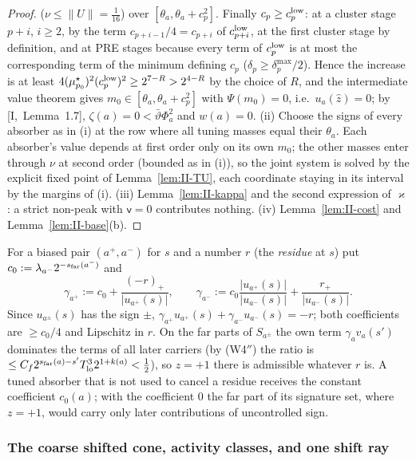 \documentclass[10pt]{amsart}
\theoremstyle{definition}
\theoremstyle{remark}
\newcommand{\zh}{\hat z}
\begin{document}
\begin{proof}
($\nu\le\|U\|=\frac1{16}$) over $[\theta_a,\theta_a+c_p^2]$.  Finally $c_p\ge
c^{\rm low}_p$: at a cluster stage $p+i$, $i\ge2$, by the term $c_{p+i-1}/4=
c_{p+i}$ of $c^{\rm low}_{p+i}$, at the first cluster stage by definition, and
at PRE stages because every term of $c^{\rm low}_p$ is at most the corresponding
term of the minimum defining $c_p$ ($\delta_p\ge\delta^{\max}_p/2$).  Hence the
increase is at least $4(\mu^\star_{p_0})^2(c^{\rm low}_p)^2\ge2^{7-R}>2^{4-R}$ by
the choice of $R$, and the intermediate value theorem gives $m_0\in[\theta_a,
\theta_a+c_p^2]$ with $\Psi(m_0)=0$, i.e.\ $u_a(\zh)=0$; by [I,~Lemma~1.7],
$\zeta(a)=0<\bar\vartheta\Phi_a^2$ and $w(a)=0$.  (ii) Choose the signs of every
absorber as in (i) at the row where all tuning masses equal their $\theta_a$.
Each absorber's value depends at first order only on its own $m_0$; the other
masses enter through $\nu$ at second order (bounded as in (i)), so the joint
system is solved by the explicit fixed point of Lemma~\ref{lem:II-TU}, each
coordinate staying in its interval by the margins of (i).  (iii) Lemma~\ref{lem:II-kappa} and the
second expression of $\varkappa$: a strict non-peak with $\mathsf v=0$ contributes
nothing.  (iv) Lemma~\ref{lem:II-cost} and Lemma~\ref{lem:II-base}(b).
\end{proof}

For a biased pair $(a^+,a^-)$ for $s$ and a number $r$ (the \emph{residue} at $s$)
put $c_0:=\lambda_{a^-}2^{-s_{\rm far}(a^-)}$ and
\[
 \gamma_{a^+}:=c_0+\frac{(-r)_+}{|u_{a^+}(s)|},\qquad\gamma_{a^-}:=c_0\frac{|u_{a^+}(s)|}
 {|u_{a^-}(s)|}+\frac{r_+}{|u_{a^-}(s)|} .
\]
Since $u_{a^\pm}(s)$ has the sign $\pm$, $\gamma_{a^+}u_{a^+}(s)+\gamma_{a^-}u_{a^-}(s)=-r$;
both coefficients are $\ge c_0/4$ and Lipschitz in $r$.  On the far parts of
$S_{a^\pm}$ the own term $\gamma_av_a(s')$ dominates the terms of all later carriers
(by (W4$''$) the ratio is $\le C_f2^{s_{\rm far}(a)-s'}T_{\rm lo}^32^{1+k(a)}<\frac12$),
so $z=+1$ there is admissible whatever $r$ is.  A tuned absorber that is not
used to cancel a residue receives the constant coefficient $c_0(a)$; with the
coefficient $0$ the far part of its signature set, where $z=+1$, would carry only
later contributions of uncontrolled sign.

\subsubsection*{The coarse shifted cone, activity classes, and one shift ray}
\end{document}
